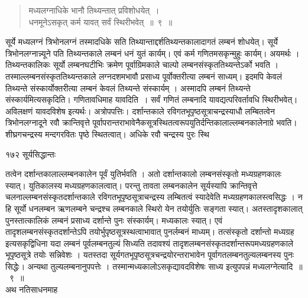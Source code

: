 \documentclass[11pt, openany]{book}
\begin{document}
\begin{quote}
{\ssi मध्यलग्नाधिके भानौ तिथ्यन्तात् प्रविशोधयेत्~।\\
धनमूनेऽसकृत् कर्म यावत् सर्वं स्थिरीभवेत्~॥~९~॥}
\end{quote}

\begin{sloppypar}

सूर्ये मध्यलग्नं त्रिभोनलग्नं तस्मादधिके सति तिथ्यान्ताद्दर्शतिथ्यन्तकालादागतं 
लम्बनं शोधयेत्। सूर्ये त्रिभोनलग्नान्न्यूने पति तिथ्यन्तकाले लम्बनं धनं युतं 
कार्यम्। एवं कर्म  गणितमसकृन्मुहुः कार्यम्। अयमर्थः । तिथ्यन्तकालिकः सूर्यो 
लम्बनघटीभिः क्रमेण पूर्वाग्रिमकाले चाल्पो लम्बनसंस्कृततिथ्यन्तेऽर्को भवति । 
तस्माल्लम्बनसंस्कृततिथ्यन्तकाले लग्नदशमभावौ प्रसाध्य पूर्वोक्तरीत्या लम्बनं साध्यम्। 
इदमपि केवलं तिथ्यन्ते संस्कार्योक्तरीत्या लम्बनं केवलं तिथ्यन्ते संस्कार्यम् । 
अस्मादपि लम्बनं तिथ्यन्ते संस्कार्यमित्यसकृदिति। गणितावधिमाह \textendash यावदिति~। 
सर्वं गणितं लम्बनादि यावद्यत्परिवर्तावधि  स्थिरीभवेत्। अविलक्षणं यावदविशेष इत्यर्थः। 
अत्रोपपत्तिः। दर्शान्तकाले रविगतभूपृष्ठसूत्राचन्द्रस्याधौ लम्बितत्वेन 
त्रिभोनलग्नादूने रवौ क्रान्तिवृत्ते 
पूर्वापरान्तराभावेनैकसूत्रस्थितत्वरूपयुतिर्दन्तिकालाल्लम्बनकालेनाग्रे भवति। 
शीघ्रगचन्द्रस्य मन्दगरवितः पृष्ठे स्थितत्वात्। अधिके रवौ चन्द्रस्य पुरः 
स्थि\textendash
\end{sloppypar}

\newpage

 \noindent १७२ \hspace{4cm} सूर्यसिद्धान्तः
\vspace{1cm}

\begin{sloppypar}
\noindent तत्वेन दर्शान्तकालाल्लम्बनकालेन पूर्वं युतिर्भवति । अतो दर्शान्तकालो लम्बनसंस्कृतो मध्यग्रहणकालः स्यात्। युतिकालस्य मध्यग्रहणकालत्वात्। परन्तु तावता लम्बनकालेन सूर्यस्यापि क्रान्तिवृत्ते चलनाल्लम्बनसंस्कृतदर्शान्तकाले रविगतभूपृष्ठसूत्राचन्द्रस्य लम्बितत्वं स्यादेवेति मध्यग्रहणकालस्त्वसिद्धः । न हि सूर्यो धनलम्बन ऋणलम्बने चन्द्रश्च लम्बनकाले स्थिरो येन तयोर्युतिः सङ्गता स्यात्। अतस्तादृशकालात् पुनस्तात्कालिकं लम्बनं प्रसाध्य दर्शान्ते पुनः संस्कार्यम्। मध्यकालः स्यात्। एवं तादृशलम्बनसंस्कृतदर्शान्तेऽपि तयोर्भुपृष्ठसूत्रस्थत्वाभावात् पुनर्लम्बनं माध्यम्। तत्संस्कृतो दर्शान्तो मध्यग्रह इत्यसकृद्विधिना यदा लम्बनं पूर्वलम्बनतुल्यं सिध्यति तदावश्यं तादृशलम्बनसंस्कृतदर्शान्तरूपमध्यग्रहणकाले भूपृष्ठसूत्रे तयोः सन्निवेशः । यतस्तदा सूर्यगतभूपृष्ठसूत्रचन्द्रयोरन्तराभावेन पूर्वागतलम्बनतुल्यलम्बनस्य पुनः सिद्धेः। अन्यथा तुल्यलम्बनानुपपत्तेः । तस्मान्मध्यकालोऽसकृद्यावदविशेषः साध्य इत्युपपन्नं मध्यलग्नेत्यादि~॥~९~॥\\
\noindent अथ नतिसाधनमाह\textendash
\end{sloppypar}
\end{document}
